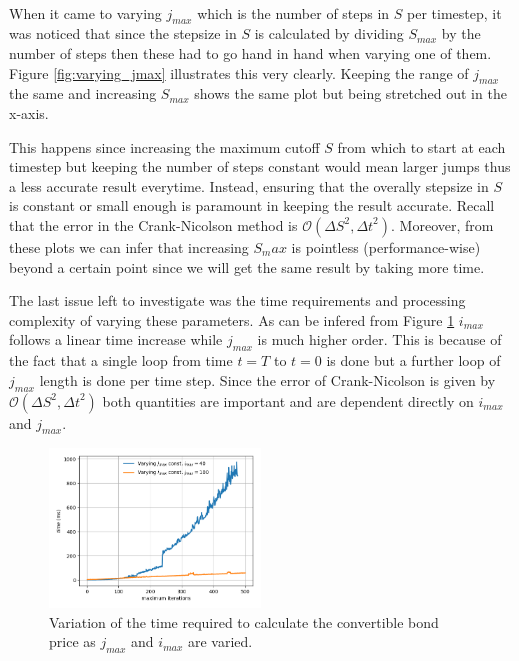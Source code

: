\documentclass{article}
\begin{document}
\\
\par When it came to varying $j_{max}$ which is the number of steps in $S$ per timestep, it was noticed
that since the stepsize in $S$ is calculated by dividing $S_{max}$ by the number of steps then these had to go
hand in hand when varying one of them.
Figure \ref{fig:varying_jmax} illustrates this very clearly.
Keeping the range of $j_{max}$ the same and increasing $S_{max}$ shows the same plot but being stretched out in the x-axis.
\\
\par This happens since increasing the maximum cutoff $S$ from which to start at each timestep but keeping the number of steps constant would mean larger jumps
thus a less accurate result everytime.
Instead, ensuring that the overally stepsize in $S$ is constant or small enough is paramount in keeping the result accurate.
Recall that the error in the Crank-Nicolson method is $\mathcal{O}({\Delta S}^2,{\Delta t}^2)$.
Moreover, from these plots we can infer that increasing $S_max$ is pointless (performance-wise) beyond a certain point since we will get the same result by taking more time.
\\
\par
The last issue left to investigate was the time requirements and processing complexity of varying these parameters.
As can be infered from Figure \ref{fig:varying_smax} $i_{max}$ follows a linear time increase while $j_{max}$ is much higher order.
This is because of the fact that a single loop from time $t=T$ to $t=0$ is done but a further loop of $j_{max}$ length is done per time step.
Since the error of Crank-Nicolson is given by $\mathcal{O}({\Delta S}^2,{\Delta t}^2)$ both quantities are important and are dependent directly on $i_{max}$ and $j_{max}$.
\begin{figure}[!h]
\includegraphics[width=0.5\textwidth,center]{../images/european_time.png}
\caption{Variation of the time required to calculate the convertible bond price as $j_{max}$ and $i_{max}$ are varied.}
\label{fig:varying_smax}
\end{figure}
\end{document}
